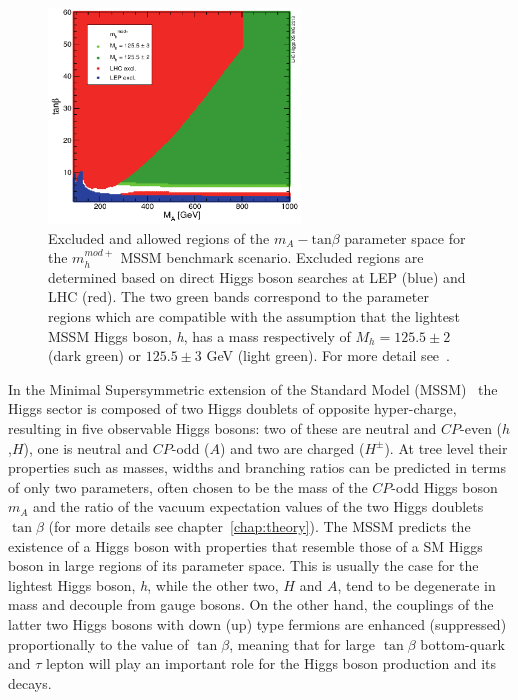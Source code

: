 \begin{figure}[tp]
     \begin{center}

            \includegraphics[width=0.6\textwidth]{figure/mh_mod.png}

    \end{center}
    \caption{Excluded and allowed regions of the $m_{A} - \text{tan}\beta$ parameter space for the  $m_{h}^{mod+}$ 
	MSSM benchmark scenario. Excluded regions are determined based on direct Higgs boson searches at LEP 
	(blue) and LHC (red). The two green 
	bands correspond to the parameter regions which are compatible with the assumption that 
	the lightest MSSM Higgs boson, \emph{h}, has a mass respectively of $M_{h} = 125.5 \pm 2$ (dark green) 
	or $125.5 \pm 3$ GeV (light green). For more detail 
	see~\cite{LHCxsec}.}
   \label{fig:mhmod}
\end{figure}

In the Minimal Supersymmetric extension of the Standard Model
(MSSM)~\cite{MSSM1, MSSM2} the Higgs sector is composed of two Higgs
doublets of opposite hyper-charge, resulting in five observable Higgs
bosons:  two of these are neutral and $CP$-even
($h$,$H$), one is neutral and $CP$-odd ($A$) and two are charged
($H^\pm$).  At tree level their properties such as masses, widths and
branching ratios can be predicted in terms of only two parameters,
often chosen to be the mass of the $CP$-odd Higgs boson $m_A$ and
the ratio of the vacuum expectation values of the two Higgs doublets
$\tan\beta$ (for more details see chapter~\ref{chap:theory}).  
The MSSM predicts the existence of a Higgs boson with properties that  
resemble those of a SM Higgs boson in large regions of its parameter space. 
This is usually the case for the lightest Higgs boson, \emph{h}, while the other two, $H$ and $A$, 
tend to be degenerate in mass and decouple from gauge bosons.
On the other hand, the couplings of the latter two Higgs bosons with down (up) type fermions are enhanced
(suppressed) proportionally to the value of $\tan\beta$, meaning that for large $\tan\beta$
bottom-quark and $\tau$ lepton will play an important role for the Higgs boson production and its decays. 
 
